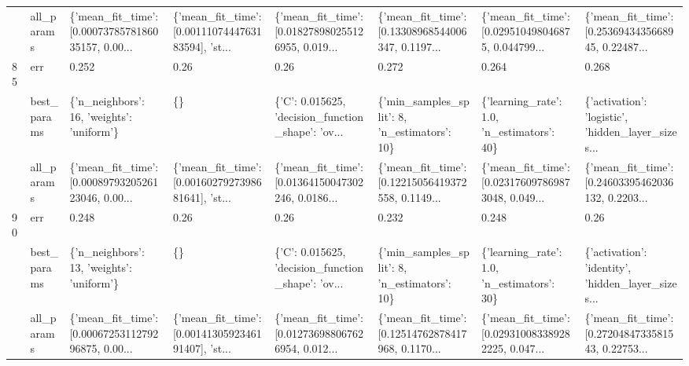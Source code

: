 \begin{tabular}{llllllll}
    & all\_params &  \{'mean\_fit\_time': [0.0007378578186035157, 0.00... &  \{'mean\_fit\_time': [0.0011107444763183594], 'st... &  \{'mean\_fit\_time': [0.018278980255126955, 0.019... &  \{'mean\_fit\_time': [0.13308968544006347, 0.1197... &  \{'mean\_fit\_time': [0.029510498046875, 0.044799... &  \{'mean\_fit\_time': [0.2536943435668945, 0.22487... \\
85  & err &                                              0.252 &                                               0.26 &                                               0.26 &                                              0.272 &                                              0.264 &                                              0.268 \\
    & best\_params &          \{'n\_neighbors': 16, 'weights': 'uniform'\} &                                                 \{\} &  \{'C': 0.015625, 'decision\_function\_shape': 'ov... &       \{'min\_samples\_split': 8, 'n\_estimators': 10\} &         \{'learning\_rate': 1.0, 'n\_estimators': 40\} &  \{'activation': 'logistic', 'hidden\_layer\_sizes... \\
    & all\_params &  \{'mean\_fit\_time': [0.0008979320526123046, 0.00... &  \{'mean\_fit\_time': [0.0016027927398681641], 'st... &  \{'mean\_fit\_time': [0.01364150047302246, 0.0186... &  \{'mean\_fit\_time': [0.12215056419372558, 0.1149... &  \{'mean\_fit\_time': [0.023176097869873048, 0.049... &  \{'mean\_fit\_time': [0.24603395462036132, 0.2203... \\
90  & err &                                              0.248 &                                               0.26 &                                               0.26 &                                              0.232 &                                              0.248 &                                               0.26 \\
    & best\_params &          \{'n\_neighbors': 13, 'weights': 'uniform'\} &                                                 \{\} &  \{'C': 0.015625, 'decision\_function\_shape': 'ov... &       \{'min\_samples\_split': 8, 'n\_estimators': 10\} &         \{'learning\_rate': 1.0, 'n\_estimators': 30\} &  \{'activation': 'identity', 'hidden\_layer\_sizes... \\
    & all\_params &  \{'mean\_fit\_time': [0.0006725311279296875, 0.00... &  \{'mean\_fit\_time': [0.0014130592346191407], 'st... &  \{'mean\_fit\_time': [0.012736988067626954, 0.012... &  \{'mean\_fit\_time': [0.12514762878417968, 0.1170... &  \{'mean\_fit\_time': [0.029310083389282225, 0.047... &  \{'mean\_fit\_time': [0.2720484733581543, 0.22753... \\

\end{tabular}
